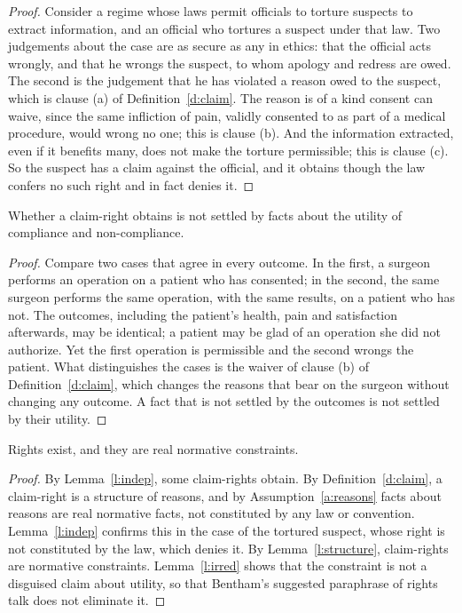 \documentclass{situationist-preprint}
\begin{document}
\begin{proof}
Consider a regime whose laws permit officials to torture suspects to extract information, and an official who tortures a suspect under that law. Two judgements about the case are as secure as any in ethics: that the official acts wrongly, and that he wrongs the suspect, to whom apology and redress are owed. The second is the judgement that he has violated a reason owed to the suspect, which is clause (a) of Definition~\ref{d:claim}. The reason is of a kind consent can waive, since the same infliction of pain, validly consented to as part of a medical procedure, would wrong no one; this is clause (b). And the information extracted, even if it benefits many, does not make the torture permissible; this is clause (c). So the suspect has a claim against the official, and it obtains though the law confers no such right and in fact denies it.
\end{proof}

\begin{lemma}\label{l:irred}
Whether a claim-right obtains is not settled by facts about the utility of compliance and non-compliance.
\end{lemma}

\begin{proof}
Compare two cases that agree in every outcome. In the first, a surgeon performs an operation on a patient who has consented; in the second, the same surgeon performs the same operation, with the same results, on a patient who has not. The outcomes, including the patient's health, pain and satisfaction afterwards, may be identical; a patient may be glad of an operation she did not authorize. Yet the first operation is permissible and the second wrongs the patient. What distinguishes the cases is the waiver of clause (b) of Definition~\ref{d:claim}, which changes the reasons that bear on the surgeon without changing any outcome. A fact that is not settled by the outcomes is not settled by their utility.
\end{proof}

\begin{theorem}\label{t:main}
Rights exist, and they are real normative constraints.
\end{theorem}

\begin{proof}
By Lemma~\ref{l:indep}, some claim-rights obtain. By Definition~\ref{d:claim}, a claim-right is a structure of reasons, and by Assumption~\ref{a:reasons} facts about reasons are real normative facts, not constituted by any law or convention. Lemma~\ref{l:indep} confirms this in the case of the tortured suspect, whose right is not constituted by the law, which denies it. By Lemma~\ref{l:structure}, claim-rights are normative constraints. Lemma~\ref{l:irred} shows that the constraint is not a disguised claim about utility, so that Bentham's suggested paraphrase of rights talk does not eliminate it.
\end{proof}
\end{document}
